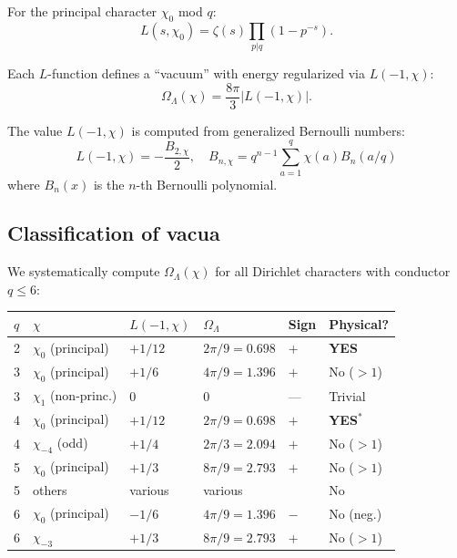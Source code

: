 \documentclass[11pt,a4paper]{article}
\begin{document}
For the principal character $\chi_0$ mod $q$:
\begin{equation}
L(s, \chi_0) = \zeta(s)\prod_{p | q}(1 - p^{-s}).
\end{equation}

Each $L$-function defines a ``vacuum'' with energy regularized
via $L(-1, \chi)$:
\begin{equation}\label{eq:omega-chi}
\Omega_\Lambda(\chi) = \frac{8\pi}{3}|L(-1, \chi)|.
\end{equation}

The value $L(-1, \chi)$ is computed from generalized Bernoulli
numbers:
\begin{equation}
L(-1, \chi) = -\frac{B_{2,\chi}}{2}, \quad
B_{n,\chi} = q^{n-1}\sum_{a=1}^{q}\chi(a)B_n(a/q)
\end{equation}
where $B_n(x)$ is the $n$-th Bernoulli polynomial.

\subsection{Classification of vacua}

We systematically compute $\Omega_\Lambda(\chi)$ for all Dirichlet
characters with conductor $q \leq 6$:

\begin{center}
\small
\begin{tabular}{llllll}
\toprule
$q$ & $\chi$ & $L(-1,\chi)$ & $\Omega_\Lambda$ & Sign & Physical? \\
\midrule
2 & $\chi_0$ (principal) & $+1/12$ & $2\pi/9 = 0.698$ & $+$ & \textbf{YES} \\
3 & $\chi_0$ (principal) & $+1/6$ & $4\pi/9 = 1.396$ & $+$ & No ($>1$) \\
3 & $\chi_1$ (non-princ.) & $0$ & $0$ & --- & Trivial \\
4 & $\chi_0$ (principal) & $+1/12$ & $2\pi/9 = 0.698$ & $+$ & \textbf{YES}$^*$ \\
4 & $\chi_{-4}$ (odd) & $+1/4$ & $2\pi/3 = 2.094$ & $+$ & No ($>1$) \\
5 & $\chi_0$ (principal) & $+1/3$ & $8\pi/9 = 2.793$ & $+$ & No ($>1$) \\
5 & others & various & various & & No \\
6 & $\chi_0$ (principal) & $-1/6$ & $4\pi/9 = 1.396$ & $-$ & No (neg.) \\
6 & $\chi_{-3}$ & $+1/3$ & $8\pi/9 = 2.793$ & $+$ & No ($>1$) \\
\bottomrule
\end{tabular}
\end{center}
\end{document}

